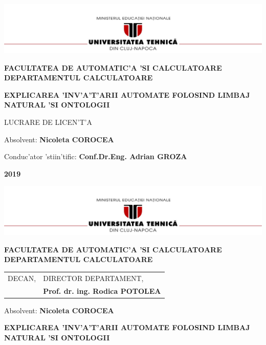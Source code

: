 \documentclass[12pt,a4paper,twoside]{report}
\renewcommand{\thesisauthor}{Nicoleta COROCEA}    %
\renewcommand{\thesisyear}{2019}      %
\renewcommand{\thesistitle}{EXPLICAREA 'INV'A'T'ARII AUTOMATE FOLOSIND LIMBAJ NATURAL 'SI ONTOLOGII} %
\renewcommand{\thesissupervisor}{Conf.Dr.Eng. Adrian GROZA}
\newcommand{\department}{FACULTATEA DE AUTOMATIC'A 'SI CALCULATOARE\\
DEPARTAMENTUL CALCULATOARE}
\newcommand{\thesis}{LUCRARE DE LICEN'T'A}
\newcommand{\utcnlogo}{\includegraphics[width=15cm]{img/utcn.jpg}}
\begin{document}

\newenvironment{definition}[1][Defini'tie.]{\begin{trivlist}
\item[\hskip \labelsep {\bfseries #1}]}{\end{trivlist}}





\begin{center}
\utcnlogo

{\bf \department}

\vspace{4cm}

{\bf \thesistitle} %

\vspace{1.5cm}

\thesis

\vspace{6cm}

Absolvent: {\bf \thesisauthor} 

Conduc'ator 'stiin'tific: {\bf \thesissupervisor}

\vspace{3cm}
{\bf \thesisyear}
\end{center}

\thispagestyle{empty}
\newpage

\begin{center}
\utcnlogo

{\bf \department}
\end{center}
\vspace{0.5cm}

\begin{tabular}{p{7cm}p{8cm}}
 \hspace{-1cm}DECAN, & DIRECTOR DEPARTAMENT,\\
\hspace{-1cm}{\bf Prof. dr. ing. Liviu MICLEA} & {\bf Prof. dr. ing. Rodica POTOLEA}\\  
\end{tabular}
 
\vspace{2cm}

\begin{center}
Absolvent: {\bf \thesisauthor}

\vspace{1cm}

{\bf \thesistitle}
\end{center}
\end{document}
